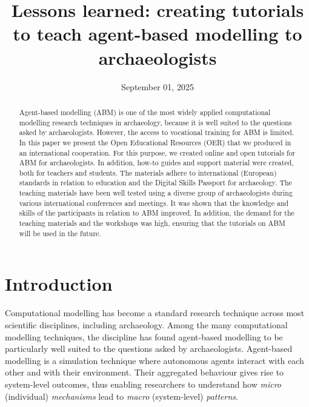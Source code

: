 \documentclass[
]{article}
\title{Lessons learned: creating tutorials to teach agent-based modelling to archaeologists}
\author{}
\date{\vspace{-2.5em}September 01, 2025}
\begin{document}
\maketitle
\begin{abstract}
Agent-based modelling (ABM) is one of the most widely applied computational modelling research techniques in archaeology, because it is well suited to the questions asked by archaeologists. However, the access to vocational training for ABM is limited. In this paper we present the Open Educational Resources (OER) that we produced in an international cooperation. For this purpose, we created online and open tutorials for ABM for archaeologists. In addition, how-to guides and support material were created, both for teachers and students. The materials adhere to international (European) standards in relation to education and the Digital Skills Passport for archaeology. The teaching materials have been well tested using a diverse group of archaeologists during various international conferences and meetings. It was shown that the knowledge and skills of the participants in relation to ABM improved. In addition, the demand for the teaching materials and the workshops was high, ensuring that the tutorials on ABM will be used in the future.
\end{abstract}

{
\setcounter{tocdepth}{2}
\tableofcontents
}
\hypertarget{introduction}{%
\section{Introduction}\label{introduction}}

Computational modelling has become a standard research technique across most scientific disciplines, including archaeology. Among the many computational modelling techniques, the discipline has found agent-based modelling to be particularly well suited to the questions asked by archaeologists. Agent-based modelling is a simulation technique where autonomous agents interact with each other and with their environment. Their aggregated behaviour gives rise to system-level outcomes, thus enabling researchers to understand how \emph{micro} (individual) \emph{mechanisms} lead to \emph{macro} (system-level) \emph{patterns}.
\end{document}
